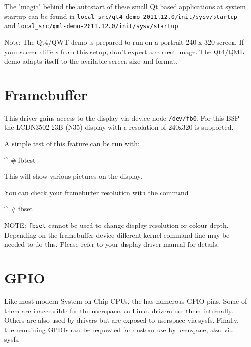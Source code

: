 The "magic" behind the autostart of these small Qt based applications at system
startup can be found in \texttt{local\_src/qt4-demo-2011.12.0/init/sysv/startup}
and \texttt{local\_src/qml-demo-2011.12.0/init/sysv/startup}.

Note: The Qt4/QWT demo is prepared to run on a portrait 240 x 320 screen. If
your screen differs from this setup, don't expect a correct image. The Qt4/QML
demo adapts itself to the available screen size and format.


\newcommand{\perDisplayName}{LCDN3502-23B (N35)}
\newcommand{\perDisplayRes}{240x320}

\section{Framebuffer}					\label{sec:fb}

This driver gains access to the display via device node \texttt{/dev/fb0}.
For this BSP the \perDisplayName{} display with a resolution of
\perDisplayRes{} is supported.

A simple test of this feature can be run with:

\begin{ptxshell}[escapechar=|]{^}
# fbtest
\end{ptxshell}

This will show various pictures on the display.

You can check your framebuffer resolution with the command
\begin{ptxshell}[escapechar=|]{^}
# fbset
\end{ptxshell}

NOTE: \texttt{fbset} cannot be used to change display resolution or colour depth.
Depending on the framebuffer device different kernel command line may be needed
to do this. Please refer to your display driver manual for details.


\newcommand{\perGpioChip}{192}
\newcommand{\perGpioNumber}{193}

\section{GPIO}					\label{sec:GPIO}

Like most modern System-on-Chip CPUs, the \perCpuName{} has numerous GPIO pins.
Some of them are inaccessible for the userspace, as Linux drivers use them
internally. Others are also used by drivers but are exposed to userspace via
sysfs. Finally, the remaining GPIOs can be requested for custom use by
userspace, also via sysfs.

